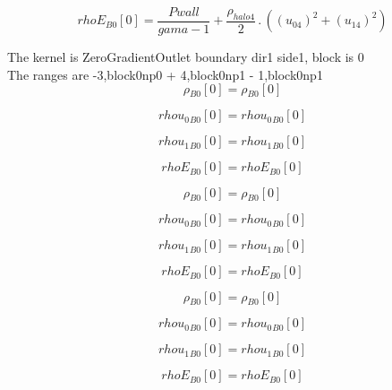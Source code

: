 \documentclass{article}
\begin{document}
\begin{dmath}{rhoE{_{B0}}}[{0}] = \frac{Pwall}{gama - 1} + \frac{\rho_{halo 4}}{2} \,.\, \left(\left(u_{04} \right)^{2} + \left(u_{14} \right)^{2}\right)\end{dmath}

\noindent The kernel is ZeroGradientOutlet boundary dir1 side1, block is 0\\\noindent The ranges are -3,block0np0 + 4,block0np1 - 1,block0np1\\\begin{dmath}{\rho{_{B0}}}[{0}] = {\rho{_{B0}}}[{0}]\end{dmath}

\begin{dmath}{rhou_{0}{_{B0}}}[{0}] = {rhou_{0}{_{B0}}}[{0}]\end{dmath}

\begin{dmath}{rhou_{1}{_{B0}}}[{0}] = {rhou_{1}{_{B0}}}[{0}]\end{dmath}

\begin{dmath}{rhoE{_{B0}}}[{0}] = {rhoE{_{B0}}}[{0}]\end{dmath}

\begin{dmath}{\rho{_{B0}}}[{0}] = {\rho{_{B0}}}[{0}]\end{dmath}

\begin{dmath}{rhou_{0}{_{B0}}}[{0}] = {rhou_{0}{_{B0}}}[{0}]\end{dmath}

\begin{dmath}{rhou_{1}{_{B0}}}[{0}] = {rhou_{1}{_{B0}}}[{0}]\end{dmath}

\begin{dmath}{rhoE{_{B0}}}[{0}] = {rhoE{_{B0}}}[{0}]\end{dmath}

\begin{dmath}{\rho{_{B0}}}[{0}] = {\rho{_{B0}}}[{0}]\end{dmath}

\begin{dmath}{rhou_{0}{_{B0}}}[{0}] = {rhou_{0}{_{B0}}}[{0}]\end{dmath}

\begin{dmath}{rhou_{1}{_{B0}}}[{0}] = {rhou_{1}{_{B0}}}[{0}]\end{dmath}

\begin{dmath}{rhoE{_{B0}}}[{0}] = {rhoE{_{B0}}}[{0}]\end{dmath}
\end{document}
